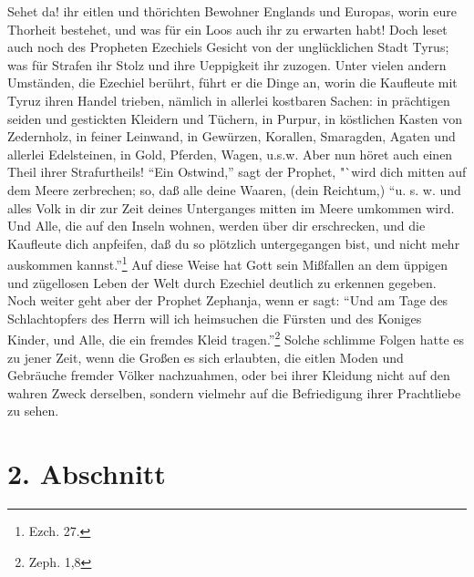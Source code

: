 Sehet da! ihr eitlen und thörichten Bewohner Englands und Europas, worin eure Thorheit bestehet, und was für ein Loos auch ihr zu erwarten habt! Doch leset auch noch des Propheten Ezechiels Gesicht von der unglücklichen Stadt Tyrus; was für Strafen ihr Stolz und ihre Ueppigkeit ihr zuzogen. Unter vielen andern Umständen, die Ezechiel berührt, führt er die Dinge an, worin die Kaufleute mit Tyruz ihren Handel trieben, nämlich in allerlei kostbaren Sachen: in prächtigen seiden und gestickten Kleidern und Tüchern, in Purpur, in köstlichen Kasten von Zedernholz, in feiner Leinwand, in Gewürzen, Korallen, Smaragden, Agaten und allerlei Edelsteinen, in Gold, Pferden, Wagen, u.s.w. Aber nun höret auch einen Theil ihrer Strafurtheils! "`Ein Ostwind,"' sagt der Prophet, "`wird dich mitten auf dem Meere zerbrechen; so, daß alle deine Waaren, (dein Reichtum,) "`u. s. w. und alles Volk in dir zur Zeit deines Unterganges mitten im Meere umkommen wird. Und Alle, die auf den Inseln wohnen, werden über dir erschrecken, und die Kaufleute dich anpfeifen, daß du so plötzlich untergegangen bist, und nicht mehr auskommen kannst."'\footnote{Ezch. 27.} Auf diese Weise hat Gott sein Mißfallen an dem üppigen und zügellosen Leben der Welt durch Ezechiel deutlich zu erkennen gegeben. Noch weiter geht aber der Prophet Zephanja, wenn er sagt: "`Und am Tage des Schlachtopfers des Herrn will ich heimsuchen die Fürsten und des Koniges Kinder, und Alle, die ein fremdes Kleid tragen."'\footnote{Zeph. 1,8} Solche schlimme Folgen hatte es zu jener Zeit, wenn die Großen es sich erlaubten, die eitlen Moden und Gebräuche fremder Völker nachzuahmen, oder bei ihrer Kleidung nicht auf den wahren Zweck derselben, sondern vielmehr auf die Befriedigung ihrer Prachtliebe zu sehen.

\section{2. Abschnitt}

